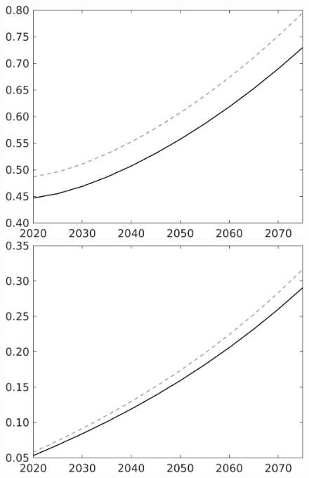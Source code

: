 \documentclass[12pt]{article}
\begin{document}
\begin{figure}[h!!]
\begin{minipage}[]{0.32\textwidth}
	\end{minipage}	
	\begin{minipage}[]{0.32\textwidth}
		\includegraphics[width=1\textwidth]{../../codding_model/own_basedOnFried/optimalPol_010922_revision/figures/all_13Sept22/CompTaul_Equlab_LFBAU_Reg0_F_spillover0_nsk1_xgr0_knspil0_sep1_countec0_GovRev0_etaa0.79_lgd0.png}
	\end{minipage}	
	\begin{minipage}[]{0.32\textwidth}
		\includegraphics[width=1\textwidth]{../../codding_model/own_basedOnFried/optimalPol_010922_revision/figures/all_13Sept22/CompTaul_Equlab_LFBAU_Reg0_G_spillover0_nsk1_xgr0_knspil0_sep1_countec0_GovRev0_etaa0.79_lgd0.png}

\end{minipage}
\end{figure}
\end{document}
